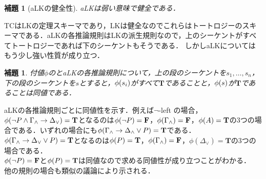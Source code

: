 \documentclass{ltjsarticle}
\makeatletter
\theoremstyle{mystyle1}
\theoremstyle{mystyle3}
\newtheorem{lem}[cor]{補題}
\theoremstyle{mystyle2}
\renewenvironment{proof}[1][\proofname]{\par
  \pushQED{\qed}%
  \normalfont
  \topsep6\p@\@plus6\p@ \trivlist
  \item[\hskip\labelsep{\bfseries\sffamily #1}]\ignorespaces
}{%
  \popQED\endtrivlist\@endpefalse
}
\renewcommand\proofname{\ensuremath{\because}}
\newcommand{\bT}{\ensuremath{\mathbf{T}}}
\newcommand{\bF}{\ensuremath{\mathbf{F}}}
\makeatother
\begin{document}
\begin{lem}[aLKの健全性]
  aLKは弱い意味で健全である．
\end{lem}
\begin{proof}
  TCはLKの定理スキーマであり，LKは健全なのでこれらはトートロジーのスキーマである．aLKの各推論規則はLKの派生規則なので，上のシーケントがすべてトートロジーであれば下のシーケントもそうである．
\end{proof}
しかしaLKについてはもう少し強い性質が成り立つ．
\begin{lem}\label{lem:12}
  付値$\phi$のとaLKの各推論規則について，上の段のシーケントを$s_1,\ldots,s_n$，下の段のシーケントを$s$とすると，$\phi\qty(s_i)$がすべて\bT であることと，$\phi\qty(s)$が\bT であることは同値である．
\end{lem}
\begin{proof}
  aLKの各推論規則ごとに同値性を示す．例えば$\neg$-left の場合，$\phi\qty(\neg P\wedge\Gamma_\wedge\to\Delta_\vee)=\bT$となるのは$\phi\qty(\neg P)=\bF$，$\phi\qty(\Gamma_\wedge)=\bF$，$\phi\qty(A)=\bT$の3つの場合である．いずれの場合にも$\phi\qty(\Gamma_\wedge\to\Delta_\wedge\vee P)=\bT$である．$\phi\qty(\Gamma_\wedge\to\Delta_\vee\vee P)=\bT$となるのは$\phi\qty(P)=\bT$，$\phi\qty(\Gamma_\wedge)=\bF$，$\phi(\Delta_\vee)=\bT$の3つの場合である．\\
  $\phi\qty(\neg P)=\bF$と$\phi\qty(P)=\bT$は同値なので求める同値性が成り立つことがわかる．\\
  他の規則の場合も類似の議論により示される．
\end{proof}
\end{document}

